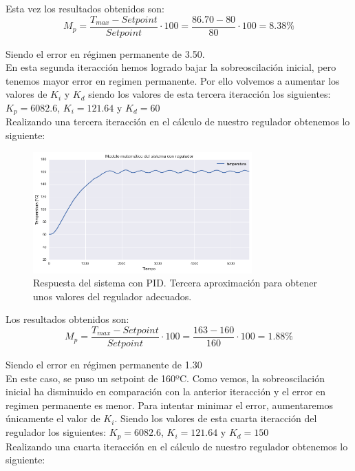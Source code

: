 Esta vez los resultados obtenidos son:
$$M_{p}=\frac{T_{max}-Setpoint}{Setpoint} \cdot 100 = \frac{86.70-80}{80} \cdot 100 = 8.38\%$$ 

Siendo el error en régimen permanente de 3.50.\\

En esta segunda iteracción hemos logrado bajar la sobreoscilación inicial, pero tenemos mayor error en regimen permanente. Por ello volvemos a aumentar los valores de $K_i$ y $K_d$ siendo los valores de esta tercera iteracción los siguientes: $K_p = 6082.6$, $K_i=121.64$ y $K_d=60$\\

Realizando una tercera iteracción en el cálculo de nuestro regulador obtenemos lo siguiente:

\begin{figure}[H]
    \centering
    \includegraphics[width=0.75\textwidth]{images/PLC/modelado/modelado_34_1.png}
    \caption[Respuesta del sistema con PID. Iteracción 3]{Respuesta del sistema con PID. Tercera aproximación para obtener unos valores del regulador adecuados.}
    \label{fig:plc_PID3}
\end{figure}

Los resultados obtenidos son:
$$M_{p}=\frac{T_{max}-Setpoint}{Setpoint} \cdot 100 = \frac{163-160}{160} \cdot 100 = 1.88\%$$ 

Siendo el error en régimen permanente de 1.30\\

En este caso, se puso un setpoint de 160ºC. Como vemos, la sobreoscilación inicial ha disminuido en comparación con la anterior iteracción y el error en regimen permanente es menor. Para intentar minimar el error, aumentaremos únicamente el valor de $K_i$. Siendo los valores de esta cuarta iteracción del regulador los siguientes: $K_p = 6082.6$, $K_i=121.64$ y $K_d=150$\\

Realizando una cuarta iteracción en el cálculo de nuestro regulador obtenemos lo siguiente:

